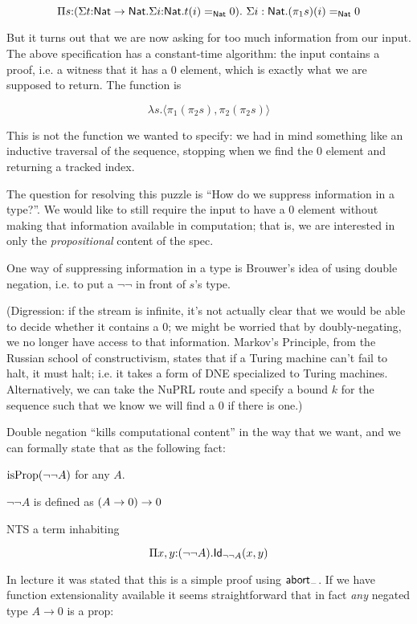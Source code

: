 \documentclass[11pt]{article}
\begin{document}
\[
\Pi{s{:}(\Sigma{t{:}\Nat\to\Nat}.\Sigma{i{:}\Nat}.t(i) =_{\Nat}0}).\ 
  \Sigma{i:\Nat}.(\pi_1 s)(i)=_{\Nat} 0
\]

But it turns out that we are now asking for too much information from our
input. The above specification has a constant-time algorithm: the input
contains a proof, i.e. a witness that it has a 0 element, which is exactly
what we are supposed to return. The function is

\[
\lambda{s}.\langle \pi_1 (\pi_2 s), \pi_2 (\pi_2 s) \rangle
\]

This is not the function we wanted to specify: we had in mind something
like an inductive traversal of the sequence, stopping when we find the 0
element and returning a tracked index.

The question for resolving this puzzle is ``How do we suppress information
in a type?''. We would like to still require the input to have a 0 element
without making that information available in computation; that is, we are
interested in only the {\em propositional} content of the spec.

One way of suppressing information in a type is Brouwer's idea of using
double negation, i.e. to put a $\lnot\lnot$ in front of $s$'s type. 

(Digression: if the stream is infinite, it's not actually clear that we
would be able to decide whether it contains a 0; we might be worried that
by doubly-negating, we no longer have access to that information.
Markov's Principle, from the Russian school of constructivism, states that
if a Turing machine can't fail to halt, it must halt; i.e. it takes a form
of DNE specialized to Turing machines. Alternatively, we can take the NuPRL
route and specify a bound $k$ for the sequence such that we know we will
find a $0$ if there is one.)

Double negation ``kills computational content'' in the way that we want,
and we can formally state that as the following fact:

$\operatorname{isProp}(\lnot\lnot A)$ for any $A$.

$\lnot\lnot A$ is defined as $(A\to 0) \to 0$

NTS a term inhabiting

\[
\Pi{x,y}{:}(\lnot\lnot A).\mathsf{Id}_{\lnot\lnot A}(x,y)
\]

In lecture it was stated that this is a simple proof using $\mathsf{abort}_{-}$. If we
have function extensionality available it seems straightforward that in
fact {\em any} negated type $A \to 0$ is a prop:
\end{document}
